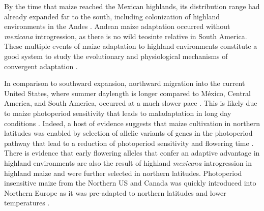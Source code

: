 \documentclass[9pt,twocolumn,twoside,lineno]{BioRxiv}
\begin{document}
By the time that maize reached the Mexican highlands, its distribution range had already expanded far to the south, including colonization of highland environments in the  Andes \cite{Athens2016-ep, Grobman2012-pm}. 
Andean maize adaptation occurred without \textit{mexicana} introgression, as there is no wild teosinte relative in South America.
These multiple events of maize adaptation to highland environments constitute a good system to study the evolutionary and physiological mechanisms of convergent adaptation \cite{Takuno2015-uj, Wang2020-mp}.

In comparison to southward expansion, northward migration into the current United States, where summer daylength is longer compared to México, Central America, and South America, occurred at a much slower pace \cite{Da_Fonseca2015-zh, Swarts2017-ge}. 
This is likely due to maize photoperiod sensitivity that leads to maladaptation in long day conditions \cite{Hung2012-ms}. 
Indeed, a host of evidence suggests that maize cultivation in northern latitudes was enabled by selection of allelic variants of genes in the photoperiod pathway that lead to a reduction of photoperiod sensitivity and flowering time \cite{Liang2018-af, Guo2018-on, Coles2010-db, Huang2018-ga, Yang2013-lg, Salvi2007-ku, Hung2012-ms}.
There is evidence that early flowering alleles that confer an adaptive advantage in highland environments are also the result of highland \textit{mexicana} introgression in highland maize \cite{Guo2018-on} and were further selected in northern latitudes.
Photoperiod insensitive maize from the Northern US and Canada was quickly introduced into Northern Europe as it was pre-adapted to northern latitudes and lower temperatures \cite{Brandenburg2017-ii}.
\end{document}

